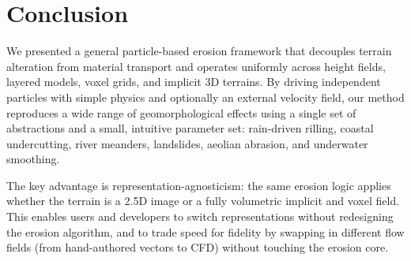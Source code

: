 

\section{Conclusion}
\label{sec:erosion-conclusion}

We presented a general particle-based erosion framework that decouples terrain alteration from material transport and operates uniformly across height fields, layered models, voxel grids, and implicit 3D terrains. By driving independent particles with simple physics and optionally an external velocity field, our method reproduces a wide range of geomorphological effects using a single set of abstractions and a small, intuitive parameter set: rain-driven rilling, coastal undercutting, river meanders, landslides, aeolian abrasion, and underwater smoothing.

The key advantage is representation-agnosticism: the same erosion logic applies whether the terrain is a 2.5D image or a fully volumetric implicit and voxel field. This enables users and developers to switch representations without redesigning the erosion algorithm, and to trade speed for fidelity by swapping in different flow fields (from hand-authored vectors to CFD) without touching the erosion core.


